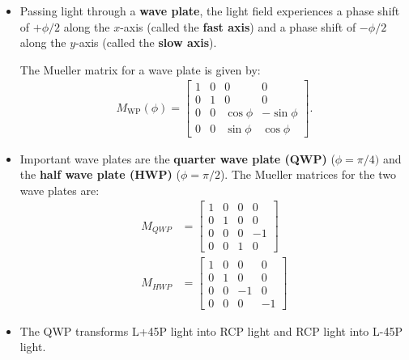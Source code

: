 \documentclass[10pt]{article}
\begin{document}
\begin{itemize}
		\item Passing light through a \textbf{wave plate}, the light field experiences a phase shift of $+\phi/2$ along the $x$-axis (called the \textbf{fast axis}) and a phase shift of $-\phi/2$ along the $y$-axis (called the \textbf{slow axis}).

		The Mueller matrix for a wave plate is given by:
		\begin{align*}
			M_{\mathrm{WP}}(\phi) = \begin{bmatrix}
				1 & 0 & 0 & 0 \\
				0 & 1 & 0 & 0 \\
				0 & 0 & \cos\phi & -\sin\phi \\
				0 & 0 & \sin\phi & \cos\phi
			\end{bmatrix}.
		\end{align*}

		\item Important wave plates are the \textbf{quarter wave plate (QWP)} ($\phi = \pi/4)$ and the \textbf{half wave plate (HWP)} ($\phi = \pi/2$).  The Mueller matrices for the two wave plates are:
		\begin{align*}
			M_{QWP} &= \begin{bmatrix}
				1 & 0 & 0 & 0 \\
				0 & 1 & 0 & 0 \\
				0 & 0 & 0 & -1 \\
				0 & 0 & 1 & 0
			\end{bmatrix} \\
			M_{HWP} &= \begin{bmatrix}
				1 & 0 & 0 & 0 \\
				0 & 1 & 0 & 0 \\
				0 & 0 & -1 & 0 \\
				0 & 0 & 0 & -1
			\end{bmatrix}
		\end{align*}

		\item The QWP transforms L+45P light into RCP light and RCP light into L-45P light.


\end{itemize}
\end{document}
